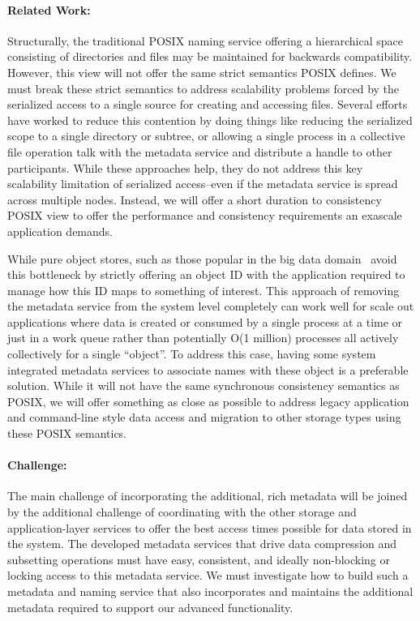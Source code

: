 \paragraph{Related Work:}
Structurally, the traditional POSIX naming service offering a hierarchical
space consisting of directories and files may be maintained for backwards
compatibility. However, this view will not offer the same strict semantics
POSIX defines. We must break these strict semantics to address scalability
problems forced by the serialized access to a single source for creating and
accessing files.  Several efforts~\cite{patil:2007:giga+,carns:pvfs} have
worked to reduce this contention by doing things like reducing the serialized
scope to a single directory or subtree, or allowing a single process in a
collective file operation talk with the metadata service and distribute a
handle to other participants. While these approaches help, they do not address
this key scalability limitation of serialized access--even if the metadata
service is spread across multiple nodes. Instead, we will offer a short
duration to consistency POSIX view to offer the performance and consistency
requirements an exascale application demands.

While pure object stores, such as those popular in the big data
domain~\cite{Fitzpatrick:2004:memcached,others} avoid this bottleneck by
strictly offering an object ID with the application required to manage how this
ID maps to something of interest. This approach of removing the metadata
service from the system level completely can work well for scale out
applications where data is created or consumed by a single process at a time or
just in a work queue rather than potentially O(1 million) processes all
actively collectively for a single ``object''. To address this case, having
some system integrated metadata services to associate names with these object
is a preferable solution. While it will not have the same synchronous
consistency semantics as POSIX, we will offer something as close as possible to
address legacy application and command-line style data access and migration to
other storage types using these POSIX semantics.

\paragraph{Challenge:}
The main challenge of incorporating the additional, rich metadata will be
joined by the additional challenge of coordinating with the other storage and
application-layer services to offer the best access times possible for data
stored in the system. The developed metadata services that drive data
compression and subsetting operations must have easy, consistent, and ideally
non-blocking or locking access to this metadata service. We must investigate
how to build such a metadata and naming service that also incorporates and
maintains the additional metadata required to support our advanced
functionality.

